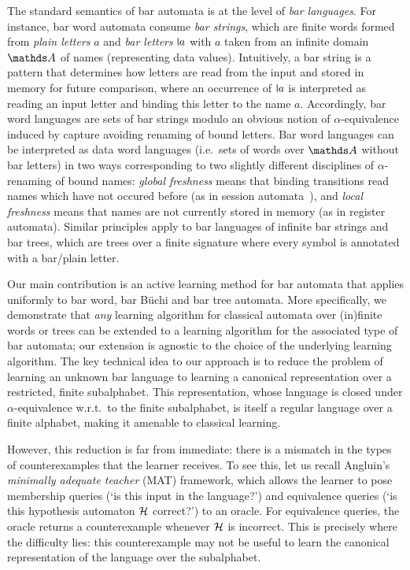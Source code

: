 \documentclass[a4paper,UKenglish,cleveref,autoref,thm-restate,numberwithinsect,final]{lipics-v2021}
\begin{document}
The standard semantics of bar automata is at the level of \emph{bar languages}. For instance, bar word automata consume \emph{bar strings}, which are finite words formed from \emph{plain letters} $a$ and \emph{bar letters} $\newletter a$ with $a$ taken from an infinite domain $\names$ of names (representing data values). Intuitively, a bar string
is a pattern that determines how letters are read from the input and
stored in memory for future comparison, where an occurrence of $\newletter a$ is interpreted as
reading an input letter and binding this letter to the name $a$. Accordingly, bar word languages are
sets of bar strings modulo an obvious notion of $\alpha$-equivalence induced by capture avoiding
renaming of bound letters. Bar word languages can be interpreted as data word languages (i.e.~sets of words over $\names$ without bar letters) in two ways corresponding to two slightly different disciplines of $\alpha$-renaming of bound names: \emph{global freshness} means that binding transitions read names which have not occured before (as in session automata~\cite{BolligEA14}), and \emph{local freshness} means that names are not currently stored in memory (as in register automata).
Similar principles apply to bar languages of infinite bar strings and bar trees, which are trees over a finite signature where every symbol is annotated with a bar/plain letter.

Our main contribution is an active learning method for bar automata that applies {uniformly} to bar word, bar Büchi and bar tree automata.
More specifically, we demonstrate that \emph{any} learning algorithm for classical automata over
(in)finite words or trees can be extended to a learning algorithm for the associated type of
bar automata; our extension is agnostic to the
choice of the underlying learning algorithm. The key technical idea to our approach is to reduce the problem of
learning an unknown bar language to learning a canonical representation over a restricted, finite
subalphabet. This representation, whose language is closed under
$\alpha$-equivalence w.r.t.~to the finite subalphabet, is itself a regular language over a
finite alphabet, making it amenable to classical learning.

However, this reduction is far from immediate: there is a mismatch in the types of counterexamples that the learner receives. To see this, let us recall Angluin's \emph{minimally adequate teacher} (MAT)
framework, which allows the learner to pose membership queries (`is this input in the language?') and equivalence queries (`is this hypothesis automaton $\mathcal{H}$ correct?') to an oracle. For equivalence queries,
the oracle returns a counterexample whenever $\mathcal{H}$ is incorrect. This is precisely where the difficulty lies: this counterexample may not be useful to learn
the canonical representation of the language over the subalphabet.
\end{document}
